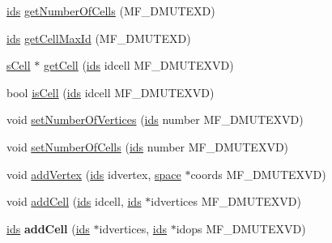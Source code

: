 \begin{DoxyCompactItemize}
\hyperlink{classmf_1_1mfMesh_a1341cfb4c31ef50c2cb5697b21b4b80e}{ids} \hyperlink{classmf_1_1mfMesh_ac3bec93c25aac230c75bd01b06bc080b}{getNumberOfCells} (MF\_\-DMUTEXD)
\item 
\hyperlink{classmf_1_1mfMesh_a1341cfb4c31ef50c2cb5697b21b4b80e}{ids} \hyperlink{classmf_1_1mfMesh_abcec01c49f7d0ff0a54759fc516dc729}{getCellMaxId} (MF\_\-DMUTEXD)
\item 
\hyperlink{classmf_1_1mfMesh_aef12414d31f355d46ead5ee4e6168048}{sCell} $\ast$ \hyperlink{classmf_1_1mfMesh_a0513b47047457b27188b4e4459224b7e}{getCell} (\hyperlink{classmf_1_1mfMesh_a1341cfb4c31ef50c2cb5697b21b4b80e}{ids} idcell MF\_\-DMUTEXVD)
\item 
bool \hyperlink{classmf_1_1mfMesh_af0b62de8edb8d278202a977a8018cbd8}{isCell} (\hyperlink{classmf_1_1mfMesh_a1341cfb4c31ef50c2cb5697b21b4b80e}{ids} idcell MF\_\-DMUTEXVD)
\item 
void \hyperlink{classmf_1_1mfMesh_ac1bfd13875d8a8434f71bb8cb2bccae4}{setNumberOfVertices} (\hyperlink{classmf_1_1mfMesh_a1341cfb4c31ef50c2cb5697b21b4b80e}{ids} number MF\_\-DMUTEXVD)
\item 
void \hyperlink{classmf_1_1mfMesh_a4cb0b7014a27de23313a4a8d9a2c60cd}{setNumberOfCells} (\hyperlink{classmf_1_1mfMesh_a1341cfb4c31ef50c2cb5697b21b4b80e}{ids} number MF\_\-DMUTEXVD)
\item 
void \hyperlink{classmf_1_1mfMesh_a8e6f7c061d37def48b72917c5836cbe3}{addVertex} (\hyperlink{classmf_1_1mfMesh_a1341cfb4c31ef50c2cb5697b21b4b80e}{ids} idvertex, \hyperlink{classmf_1_1mfMesh_a6934f60ee28bc351e8a9b4cb0d80c3c9}{space} $\ast$coords MF\_\-DMUTEXVD)
\item 
void \hyperlink{classmf_1_1mfMesh_a3099ee90d73ecc0302035fb9daeeb6a9}{addCell} (\hyperlink{classmf_1_1mfMesh_a1341cfb4c31ef50c2cb5697b21b4b80e}{ids} idcell, \hyperlink{classmf_1_1mfMesh_a1341cfb4c31ef50c2cb5697b21b4b80e}{ids} $\ast$idvertices MF\_\-DMUTEXVD)
\item 
\hypertarget{classmf_1_1mfMesh_abfbcc234dcd0dc88c8d01047424305bf}{
\hyperlink{classmf_1_1mfMesh_a1341cfb4c31ef50c2cb5697b21b4b80e}{ids} {\bfseries addCell} (\hyperlink{classmf_1_1mfMesh_a1341cfb4c31ef50c2cb5697b21b4b80e}{ids} $\ast$idvertices, \hyperlink{classmf_1_1mfMesh_a1341cfb4c31ef50c2cb5697b21b4b80e}{ids} $\ast$idops MF\_\-DMUTEXVD)}
\label{classmf_1_1mfMesh_abfbcc234dcd0dc88c8d01047424305bf}


\end{DoxyCompactItemize}
